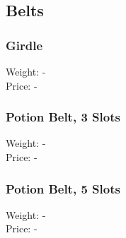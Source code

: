 \subsection{Belts}

\subsubsection{Girdle}
Weight: -\\
Price: -\\

\subsubsection{Potion Belt, 3 Slots}
Weight: -\\
Price: -\\

\subsubsection{Potion Belt, 5 Slots}
Weight: -\\
Price: -\\